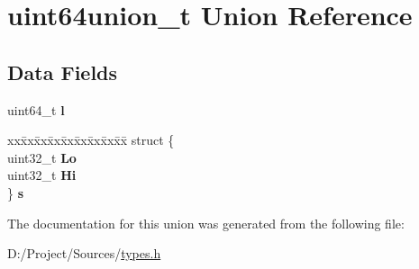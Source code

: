 \hypertarget{unionuint64union__t}{}\section{uint64union\+\_\+t Union Reference}
\label{unionuint64union__t}
\subsection*{Data Fields}
\begin{DoxyCompactItemize}
\item 
\hypertarget{unionuint64union__t_a2d5e8db071e91dd1ed90c03584facdfd}{}uint64\+\_\+t {\bfseries l}\label{unionuint64union__t_a2d5e8db071e91dd1ed90c03584facdfd}

\item 
\hypertarget{unionuint64union__t_a2c639a2ca4be26e6db02ddd9926a0576}{}\begin{tabbing}
xx\=xx\=xx\=xx\=xx\=xx\=xx\=xx\=xx\=\kill
struct \{\\
\>uint32\_t {\bfseries Lo}\\
\>uint32\_t {\bfseries Hi}\\
\} {\bfseries s}\label{unionuint64union__t_a2c639a2ca4be26e6db02ddd9926a0576}
\\

\end{tabbing}\end{DoxyCompactItemize}


The documentation for this union was generated from the following file\+:\begin{DoxyCompactItemize}
\item 
D\+:/\+Project/\+Sources/\hyperlink{types_8h}{types.\+h}\end{DoxyCompactItemize}
